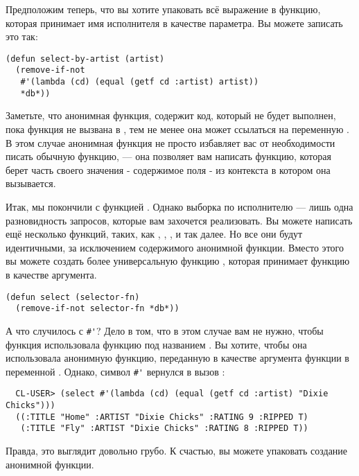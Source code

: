 Предположим теперь, что вы хотите упаковать всё выражение в функцию, которая принимает имя
исполнителя в качестве параметра. Вы можете записать это так:

\begin{lstlisting}
(defun select-by-artist (artist)
  (remove-if-not
   #'(lambda (cd) (equal (getf cd :artist) artist))
   *db*))
\end{lstlisting}

Заметьте, что анонимная функция, содержит код, который не будет выполнен, пока функция не
вызвана в , тем не менее она может ссылаться на переменную
. В этом случае анонимная функция не просто избавляет вас от необходимости
писать обычную функцию, --- она позволяет вам написать функцию, которая берет часть своего
значения - содержимое поля  - из контекста в котором она вызывается.

Итак, мы покончили с функцией . Однако выборка по исполнителю ---
лишь одна разновидность запросов, которые вам захочется реализовать. Вы можете написать
ещё несколько функций, таких, как , ,
, и так далее. Но все они будут идентичными, за
исключением содержимого анонимной функции. Вместо этого вы можете создать более
универсальную функцию , которая принимает функцию в качестве аргумента.

\begin{lstlisting}
(defun select (selector-fn)
  (remove-if-not selector-fn *db*))
\end{lstlisting}

А что случилось с \lstinline!#'!? Дело в том, что в этом случае вам не нужно, чтобы функция
 использовала функцию под названием . Вы хотите,
чтобы она использовала анонимную функцию, переданную в качестве аргумента функции
 в переменной . Однако, символ \lstinline!#'! вернулся в вызов
:

\begin{verbatim}
  CL-USER> (select #'(lambda (cd) (equal (getf cd :artist) "Dixie Chicks")))
  ((:TITLE "Home" :ARTIST "Dixie Chicks" :RATING 9 :RIPPED T)
   (:TITLE "Fly" :ARTIST "Dixie Chicks" :RATING 8 :RIPPED T))
\end{verbatim}

Правда, это выглядит довольно грубо. К счастью, вы можете упаковать создание анонимной функции.

